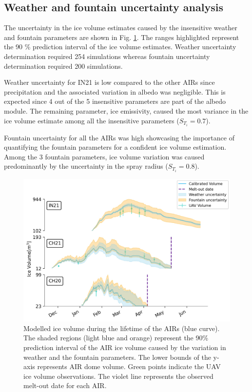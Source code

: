 \documentclass[utf8]{frontiersSCNS} %
\begin{document}
\subsection{Weather and fountain uncertainty analysis}

The uncertainty in the ice volume estimates caused by the insensitive weather and fountain parameters are shown in
Fig. \ref{fig:results}. The ranges highlighted represent the 90 \% prediction interval of the ice volume estimates.
Weather uncertainty determination required 254 simulations whereas fountain uncertainty determination required 200 simulations.

Weather uncertainty for IN21 is low compared to the other AIRs since precipitation and the associated variation in
albedo was negligible. This is expected since 4 out of the 5 insensitive parameters are part of the albedo module.
The remaining parameter, ice emissivity, caused the most variance in the ice volume estimate among all the
insensitive parameters ($S_{T_{i}} = 0.7$).

Fountain uncertainty for all the AIRs was high showcasing the importance of quantifying the fountain parameters for
a confident ice volume estimation. Among the 3 fountain parameters, ice volume variation was caused predominantly
by the uncertainty in the spray radius ($S_{T_{i}} = 0.8$).

\begin{figure}
	\begin{center}
		\includegraphics[width=\linewidth]{Figures/icev_results.jpg}
	\end{center}
	\caption{Modelled ice volume during the lifetime of the AIRs (blue curve). The shaded regions (light blue and orange)
		represent the 90\% prediction interval of the AIR ice volume caused by the variation in weather and the fountain parameters.
		The lower bounds of the y-axis represents AIR dome volume. Green points indicate the UAV ice volume observations.
		The violet line represents the observed melt-out date for each AIR.  }

	\label{fig:results}
\end{figure}
\end{document}
